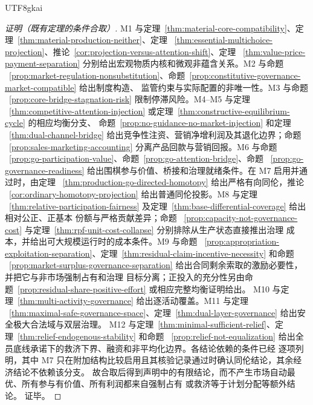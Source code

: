 \documentclass[12pt,a4paper,openany]{report}
\begin{document}
\begin{CJK*}{UTF8}{gkai}
\begin{proof}[证明（既有定理的条件合取）]
M1 与定理~\ref{thm:material-core-compatibility}、定理~\ref{thm:material-production-neither}、定理
~\ref{thm:essential-multichoice-projection}、推论~\ref{cor:projection-versus-attention-shift}、定理
~\ref{thm:value-price-payment-separation} 分别给出宏观物质内核和微观非蕴含关系。M2 与命题
~\ref{prop:market-regulation-nonsubstitution}、命题~\ref{prop:constitutive-governance-market-compatible} 给出制度构造、
监管约束与实际配置的非唯一性。M3 与命题
~\ref{prop:core-bridge-stagnation-risk} 限制停滞风险。M4--M5 与定理
~\ref{thm:competitive-attention-injection} 或定理~\ref{thm:constructive-equilibrium-cycle} 的相应均衡分支、
命题~\ref{prop:no-guidance-no-market-injection} 和定理
~\ref{thm:dual-channel-bridge} 给出竞争性注资、营销净增利润及其退化边界；命题
~\ref{prop:sales-marketing-accounting} 分离产品回款与营销回报。M6 与命题
~\ref{prop:go-participation-value}、命题~\ref{prop:go-attention-bridge}、命题
~\ref{prop:go-governance-readiness} 给出围棋参与价值、桥接和治理就绪条件。在 M7 启用并通过时，由定理
~\ref{thm:production-go-directed-homotopy} 给出严格有向同伦，推论
~\ref{cor:ordinary-homotopy-projection} 给出普通同伦投影。M8 与定理
~\ref{thm:relative-participation-fairness} 及定理~\ref{thm:base-differential-coverage} 给出相对公正、正基本
份额与严格贡献差异；命题
~\ref{prop:capacity-not-governance-cost} 与定理~\ref{thm:rpf-unit-cost-collapse} 分别排除从生产状态直接推出治理
成本，并给出可大规模运行时的成本条件。M9 与命题
~\ref{prop:appropriation-exploitation-separation}、定理~\ref{thm:residual-claim-incentive-necessity} 和命题
~\ref{prop:market-surplus-governance-separation} 给出合同剩余索取的激励必要性，并把它与非市场强制占有和治理
目标分离；正投入的充分性另由命题~\ref{prop:residual-share-positive-effort} 或相应完整均衡证明给出。
M10 与定理~\ref{thm:multi-activity-governance} 给出逐活动覆盖。M11 与定理
~\ref{thm:maximal-safe-governance-space}、定理~\ref{thm:dual-layer-governance} 给出安全极大合法域与双层治理。
M12 与定理~\ref{thm:minimal-sufficient-relief}、定理~\ref{thm:relief-endogenous-stability} 和命题
~\ref{prop:relief-not-equalization} 给出全员底线承诺下的救济下界、融资和非平均化边界。各结论依赖的条件已经
逐项列明，其中 M7 只在附加结构比较启用且其核验记录通过时确认同伦结论，其余经济结论不依赖该分支。
故合取后得到声明中的有限结论，而不产生市场自动最优、所有参与有价值、所有利润都来自强制占有
或救济等于计划分配等额外结论。
证毕。
\end{proof}


\end{CJK*}
\end{document}
